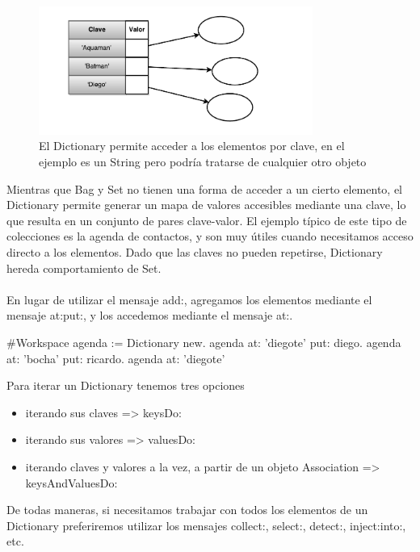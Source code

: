 \documentclass[a4paper,12pt]{book}
\begin{document}
\begin{figure}[h!]
    \centering
    \includegraphics[width=0.8\textwidth]{images/40_Dictionary.pdf}
    \caption{El Dictionary permite acceder a los elementos por clave, en el ejemplo es un String
    pero podría tratarse de cualquier otro objeto}
\end{figure}
\FloatBarrier

Mientras que Bag y Set no tienen una forma de acceder a un cierto elemento, el Dictionary permite generar un
mapa de valores accesibles mediante una clave, lo que resulta en un conjunto de pares clave-valor. El ejemplo
típico de este tipo de colecciones es la agenda de contactos, y son muy útiles cuando necesitamos
acceso directo a los elementos. Dado que las claves no pueden repetirse, Dictionary hereda
comportamiento de Set. 
\\
\\
En lugar de utilizar el mensaje add:, agregamos los elementos mediante el mensaje at:put:, y los accedemos
mediante el mensaje at:.

\begin{code}
#Workspace
agenda := Dictionary new.
agenda at: 'diegote' put: diego.
agenda at: 'bocha' put: ricardo.
agenda at: 'diegote'
\end{code}

\vspace{\baselineskip}
Para iterar un Dictionary tenemos tres opciones

\begin{itemize}
 \item iterando sus claves => keysDo:
 \item iterando sus valores => valuesDo:
 \item iterando claves y valores a la vez, a partir de un objeto Association => \newline 
 keysAndValuesDo:
\end{itemize}

De todas maneras, si necesitamos trabajar con todos los elementos de un Dictionary preferiremos utilizar
los mensajes collect:, select:, detect:, inject:into:, etc.
\end{document}
